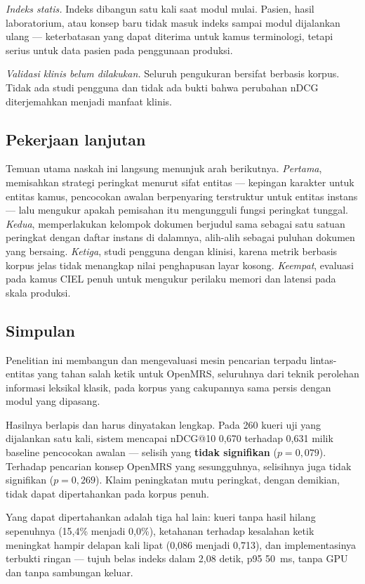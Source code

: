 \documentclass[journal,twoside,web]{ieeecolor}
\begin{document}
\emph{Indeks statis.} Indeks dibangun satu kali saat modul mulai. Pasien, hasil
laboratorium, atau konsep baru tidak masuk indeks sampai modul dijalankan ulang
--- keterbatasan yang dapat diterima untuk kamus terminologi, tetapi serius untuk
data pasien pada penggunaan produksi.

\emph{Validasi klinis belum dilakukan.} Seluruh pengukuran bersifat berbasis
korpus. Tidak ada studi pengguna dan tidak ada bukti bahwa perubahan nDCG
diterjemahkan menjadi manfaat klinis.

\subsection{Pekerjaan lanjutan}

Temuan utama naskah ini langsung menunjuk arah berikutnya. \emph{Pertama},
memisahkan strategi peringkat menurut sifat entitas --- kepingan karakter untuk
entitas kamus, pencocokan awalan berpenyaring terstruktur untuk entitas instans
--- lalu mengukur apakah pemisahan itu mengungguli fungsi peringkat tunggal.
\emph{Kedua}, memperlakukan kelompok dokumen berjudul sama sebagai satu satuan
peringkat dengan daftar instans di dalamnya, alih-alih sebagai puluhan dokumen
yang bersaing. \emph{Ketiga}, studi pengguna dengan klinisi, karena metrik
berbasis korpus jelas tidak menangkap nilai penghapusan layar kosong.
\emph{Keempat}, evaluasi pada kamus CIEL penuh untuk mengukur perilaku memori
dan latensi pada skala produksi.

\subsection{Simpulan}

Penelitian ini membangun dan mengevaluasi mesin pencarian terpadu lintas-entitas
yang tahan salah ketik untuk OpenMRS, seluruhnya dari teknik perolehan informasi
leksikal klasik, pada korpus yang cakupannya sama persis dengan modul yang
dipasang.

Hasilnya berlapis dan harus dinyatakan lengkap. Pada 260 kueri uji yang
dijalankan satu kali, sistem mencapai nDCG@10 0,670 terhadap 0,631 milik baseline
pencocokan awalan --- selisih yang \textbf{tidak signifikan} ($p = 0{,}079$).
Terhadap pencarian konsep OpenMRS yang sesungguhnya, selisihnya juga tidak
signifikan ($p = 0{,}269$). Klaim peningkatan mutu peringkat, dengan demikian,
tidak dapat dipertahankan pada korpus penuh.

Yang dapat dipertahankan adalah tiga hal lain: kueri tanpa hasil hilang
sepenuhnya (15,4\% menjadi 0,0\%), ketahanan terhadap kesalahan ketik meningkat
hampir delapan kali lipat (0,086 menjadi 0,713), dan implementasinya terbukti
ringan --- tujuh belas indeks dalam 2,08 detik, p95 50~ms, tanpa GPU dan tanpa
sambungan keluar.
\end{document}
